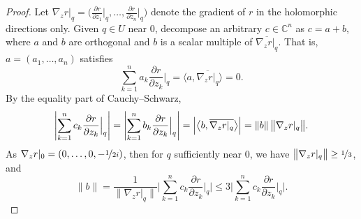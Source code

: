 \documentclass[12pt,openany]{book}
\newcommand{\blinnprod}[2]{\bigl\langle #1 , #2 \bigr\rangle}
\newcommand{\snorm}[1]{\lVert {#1} \rVert}
\newcommand{\bnorm}[1]{\bigl\lVert {#1} \bigr\rVert}
\newcommand{\Babs}[1]{\Bigl\lvert {#1} \Bigr\rvert}
\newcommand{\BBabs}[1]{\Biggl\lvert {#1} \Biggr\rvert}
\newcommand{\abs}[1]{\left\lvert {#1} \right\rvert}
\newcommand{\C}{{\mathbb{C}}}
\theoremstyle{plain}
\theoremstyle{remark}
\theoremstyle{definition}
\theoremstyle{exercise}
\theoremstyle{example}
\begin{document}
\begin{proof}
Let $\nabla_z r|_q =
\bigl(
\frac{\partial r}{\partial z_1}\big|_q,\ldots,
\frac{\partial r}{\partial z_n}\big|_q \bigr)$ denote the gradient of $r$ in
the holomorphic directions only.
Given $q \in U$ near $0$,
decompose an arbitrary $c \in \C^n$ as $c = a+b$,
where $a$ and $b$ are
orthogonal and $b$ is a scalar multiple of
$\overline{\nabla_z r|_q}$.  That is,
$a = (a_1,\ldots,a_n)$ satisfies
\begin{equation*}
\sum_{k=1}^n
a_k \frac{\partial r}{\partial z_k} \Big|_q =
\blinnprod{a}{\overline{\nabla_z r|_q}}
=
0 .
\end{equation*}
By the equality part of Cauchy--Schwarz,
\begin{equation*}
\BBabs{\sum_{k=1}^n c_k \frac{\partial r}{\partial z_k} \Big|_q}
=
\BBabs{\sum_{k=1}^n b_k \frac{\partial r}{\partial z_k} \Big|_q}
=
\Babs{\blinnprod{b}{\overline{\nabla_z r|_q}}}
=
\snorm{b} \, \bnorm{\nabla_z r|_q} .
\end{equation*}
As $\nabla_z r|_0 = (0,\ldots,0,-\nicefrac{1}{2i})$, then for $q$
sufficiently near $0$, we have
$\bnorm{\nabla_z r|_q} \geq \nicefrac{1}{3}$, and
\begin{equation} \label{eq:25boundingb}
\snorm{b} =
\frac{1}{\bnorm
{\nabla_z r|_q}}
\BBabs{\sum_{k=1}^n c_k \frac{\partial r}{\partial z_k} \Big|_q}
\leq
3 \BBabs{\sum_{k=1}^n c_k \frac{\partial r}{\partial z_k} \Big|_q}
.
\end{equation}



\end{proof}
\end{document}
